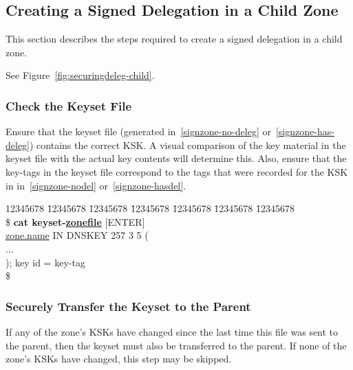
\clearpage
\subsection{Creating a Signed Delegation in a Child Zone}
\label{delegation-child}

This section describes the steps required to create a signed delegation in a
child zone.

See Figure~\ref{fig:securingdeleg-child}.


\subsubsection{Check the Keyset File}

Ensure that the keyset file (generated in~\ref{signzone-no-deleg}
or~\ref{signzone-has-deleg}) contains the correct KSK.  A visual comparison
of the key material in the keyset file with the actual key contents will
determine this.  Also, ensure that the key-tags in the keyset file correspond
to the tags that were recorded for the KSK in in~\ref{signzone-nodel}
or~\ref{signzone-hasdel}.

\begin{tabbing}
\hspace{0.5in} 12345678 \= 12345678 \= 12345678 \= 12345678 \= 12345678 \= 12345678 \= 12345678 \kill \\
\hspace{0.5in}\$ {\bf cat keyset-\underline{zonefile}} $[$ENTER$]$ \\
\hspace{0.5in} \underline{zone.name} \> \>  IN \> DNSKEY 257 3 5 ( \\
\hspace{0.5in} \> \> \> \> \> ... \\
\hspace{0.5in} \> \> \> \> ); key id = key-tag \\
\hspace{0.5in}\$ \\
\end{tabbing}


\subsubsection{Securely Transfer the Keyset to the Parent}

If any of the zone's KSKs have changed since the last time this file was sent
to the parent, then the keyset must also be transferred to the parent.
If none of the zone's KSKs have changed, this step may be skipped.

